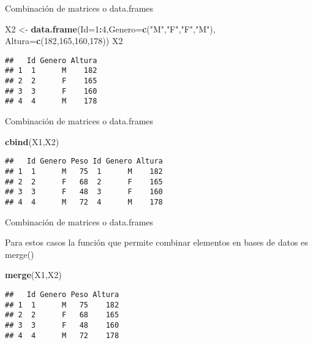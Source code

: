 \documentclass[ignorenonframetext,]{beamer}
\newenvironment{Shaded}{\begin{snugshade}}{\end{snugshade}}
\newcommand{\KeywordTok}[1]{\textcolor[rgb]{0.13,0.29,0.53}{\textbf{#1}}}
\newcommand{\DataTypeTok}[1]{\textcolor[rgb]{0.13,0.29,0.53}{#1}}
\newcommand{\DecValTok}[1]{\textcolor[rgb]{0.00,0.00,0.81}{#1}}
\newcommand{\StringTok}[1]{\textcolor[rgb]{0.31,0.60,0.02}{#1}}
\newcommand{\OperatorTok}[1]{\textcolor[rgb]{0.81,0.36,0.00}{\textbf{#1}}}
\newcommand{\NormalTok}[1]{#1}
\begin{document}
\begin{frame}[fragile]{Combinación de matrices o data.frames}

\begin{Shaded}
\begin{Highlighting}[]
\NormalTok{X2 <-}\StringTok{ }\KeywordTok{data.frame}\NormalTok{(}\DataTypeTok{Id=}\DecValTok{1}\OperatorTok{:}\DecValTok{4}\NormalTok{,}\DataTypeTok{Genero=}\KeywordTok{c}\NormalTok{(}\StringTok{"M"}\NormalTok{,}\StringTok{"F"}\NormalTok{,}\StringTok{"F"}\NormalTok{,}\StringTok{"M"}\NormalTok{),}
                 \DataTypeTok{Altura=}\KeywordTok{c}\NormalTok{(}\DecValTok{182}\NormalTok{,}\DecValTok{165}\NormalTok{,}\DecValTok{160}\NormalTok{,}\DecValTok{178}\NormalTok{))}
\NormalTok{X2}
\end{Highlighting}
\end{Shaded}

\begin{verbatim}
##   Id Genero Altura
## 1  1      M    182
## 2  2      F    165
## 3  3      F    160
## 4  4      M    178
\end{verbatim}

\end{frame}

\begin{frame}[fragile]{Combinación de matrices o data.frames}

\begin{Shaded}
\begin{Highlighting}[]
\KeywordTok{cbind}\NormalTok{(X1,X2)}
\end{Highlighting}
\end{Shaded}

\begin{verbatim}
##   Id Genero Peso Id Genero Altura
## 1  1      M   75  1      M    182
## 2  2      F   68  2      F    165
## 3  3      F   48  3      F    160
## 4  4      M   72  4      M    178
\end{verbatim}

\end{frame}

\begin{frame}[fragile]{Combinación de matrices o data.frames}

Para estos casos la función que permite combinar elementos en bases de
datos es merge()

\begin{Shaded}
\begin{Highlighting}[]
\KeywordTok{merge}\NormalTok{(X1,X2)}
\end{Highlighting}
\end{Shaded}

\begin{verbatim}
##   Id Genero Peso Altura
## 1  1      M   75    182
## 2  2      F   68    165
## 3  3      F   48    160
## 4  4      M   72    178
\end{verbatim}

\end{frame}
\end{document}
